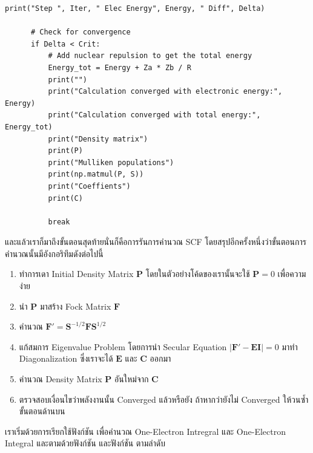 \begin{lstlisting}[style=MyPython]
      print("Step ", Iter, " Elec Energy", Energy, " Diff", Delta)

      # Check for convergence
      if Delta < Crit:
          # Add nuclear repulsion to get the total energy
          Energy_tot = Energy + Za * Zb / R
          print("")
          print("Calculation converged with electronic energy:", Energy)
          print("Calculation converged with total energy:", Energy_tot)
          print("Density matrix")
          print(P)
          print("Mulliken populations")
          print(np.matmul(P, S))
          print("Coeffients")
          print(C)

          break
\end{lstlisting}

\vspace{5pt}

\noindent {}

\vspace{5pt}

\noindent และแล้วเราก็มาถึงขั้นตอนสุดท้ายนั่นก็คือการรันการคำนวณ SCF โดยสรุปอีกครั้งหนึ่งว่าขั้นตอนการคำนวณนั้นมีอังกอริทึมดังต่อไปนี้

\begin{enumerate}[topsep=0pt,noitemsep]
  \setlength\itemsep{1em}
  \item ทำการเดา Initial Density Matrix $\bm{P}$ โดยในตัวอย่างโค้ดของเรานั้นจะใช้ $\bm{P} = 0$ เพื่อความง่าย

  \item นำ $\bm{P}$ มาสร้าง Fock Matrix $\bm{F}$

  \item คำนวณ $\bm{F'} = \bm{S}^{-1/2}\bm{F}\bm{S}^{1/2}$

  \item แก้สมการ Eigenvalue Problem โดยการนำ Secular Equation $|\bm{F'} - \bm{E}\bm{I}| = 0$ มาทำ Diagonalization
        ซึ่งเราจะได้ $\bm{E}$ และ $\bm{C}$ ออกมา

  \item คำนวณ Density Matrix $\bm{P}$ อันใหม่จาก $\bm{C}$

  \item ตรวจสอบเงื่อนไขว่าพลังงานนั้น Converged แล้วหรือยัง ถ้าหากว่ายังไม่ Converged ให้วนซ้ำขั้นตอนด้านบน
\end{enumerate}

เราเริ่มด้วยการเรียกใช้ฟังก์ชัน  เพื่อคำนวณ One-Electron Intregral และ One-Electron Integral และตามด้วยฟังก์ชัน
 และฟังก์ชัน  ตามลำดับ

